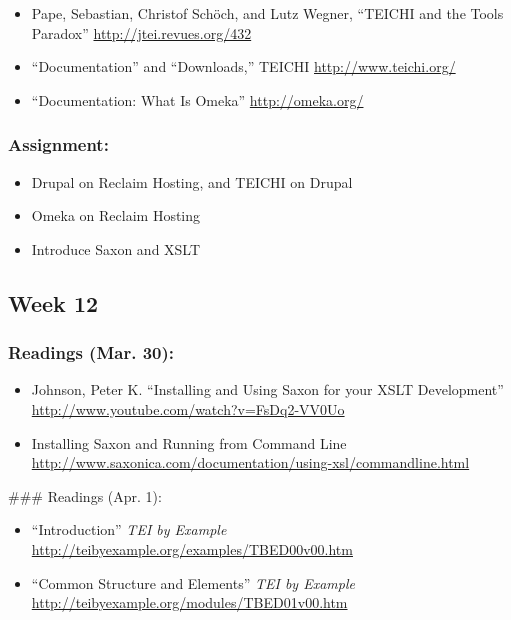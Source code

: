 \documentclass[]{article}
\begin{document}
\begin{itemize}
\itemsep1pt\parskip0pt
\item
  Pape, Sebastian, Christof Schöch, and Lutz Wegner, ``TEICHI and the
  Tools Paradox'' \url{http://jtei.revues.org/432}
\item
  ``Documentation'' and ``Downloads,'' TEICHI
  \url{http://www.teichi.org/}
\item
  ``Documentation: What Is Omeka'' \url{http://omeka.org/}
\end{itemize}

\subsubsection{Assignment:}\label{assignment-9}

\begin{itemize}
\itemsep1pt\parskip0pt
\item
  Drupal on Reclaim Hosting, and TEICHI on Drupal
\item
  Omeka on Reclaim Hosting
\item
  Introduce Saxon and XSLT
\end{itemize}

\subsection{Week 12}\label{week-12}

\subsubsection{Readings (Mar. 30):}\label{readings-mar.-30}

\begin{itemize}
\itemsep1pt\parskip0pt
\item
  Johnson, Peter K. ``Installing and Using Saxon for your XSLT
  Development'' \url{http://www.youtube.com/watch?v=FsDq2-VV0Uo}
\item
  Installing Saxon and Running from Command Line
  \url{http://www.saxonica.com/documentation/using-xsl/commandline.html}
\end{itemize}

\#\#\# Readings (Apr. 1):

\begin{itemize}
\itemsep1pt\parskip0pt
\item
  ``Introduction'' \emph{TEI by Example}
  \url{http://teibyexample.org/examples/TBED00v00.htm}
\item
  ``Common Structure and Elements'' \emph{TEI by Example}
  \url{http://teibyexample.org/modules/TBED01v00.htm}
\end{itemize}
\end{document}
